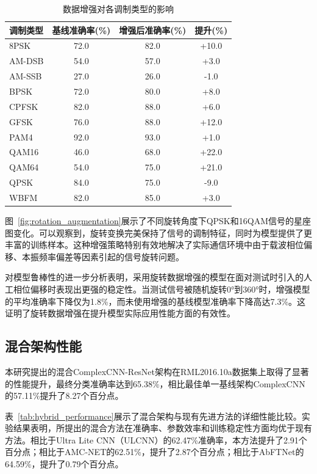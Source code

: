 \documentclass[conference]{IEEEtran}
\begin{document}
\begin{table}[h]
\centering
\caption{数据增强对各调制类型的影响}
\label{tab:data_augmentation_results}
\begin{tabular}{@{}lccc@{}}
\toprule
调制类型 & 基线准确率(\%) & 增强后准确率(\%) & 提升(\%) \\
\midrule
8PSK     & 72.0  & 82.0  & +10.0 \\
AM-DSB   & 54.0  & 57.0  & +3.0  \\
AM-SSB   & 27.0  & 26.0  & -1.0  \\
BPSK     & 72.0  & 80.0  & +8.0  \\
CPFSK    & 82.0  & 88.0  & +6.0  \\
GFSK     & 76.0  & 88.0  & +12.0 \\
PAM4     & 92.0  & 93.0  & +1.0  \\
QAM16    & 46.0  & 68.0  & +22.0 \\
QAM64    & 54.0  & 75.0  & +21.0 \\
QPSK     & 84.0  & 75.0  & -9.0  \\
WBFM     & 82.0  & 85.0  & +3.0  \\
\bottomrule
\end{tabular}
\end{table}

图~\ref{fig:rotation_augmentation}展示了不同旋转角度下QPSK和16QAM信号的星座图变化。可以观察到，旋转变换完美保持了信号的调制特征，同时为模型提供了更丰富的训练样本。这种增强策略特别有效地解决了实际通信环境中由于载波相位偏移、本振频率偏差等因素引起的信号旋转问题。

对模型鲁棒性的进一步分析表明，采用旋转数据增强的模型在面对测试时引入的人工相位偏移时表现出更强的稳定性。当测试信号被随机旋转0°到360°时，增强模型的平均准确率下降仅为1.8\%，而未使用增强的基线模型准确率下降高达7.3\%。这证明了旋转数据增强在提升模型实际应用性能方面的有效性。

\subsection{混合架构性能}

本研究提出的混合ComplexCNN-ResNet架构在RML2016.10a数据集上取得了显著的性能提升，最终分类准确率达到65.38\%，相比最佳单一基线架构ComplexCNN的57.11\%提升了8.27个百分点。

表~\ref{tab:hybrid_performance}展示了混合架构与现有先进方法的详细性能比较。实验结果表明，所提出的混合方法在准确率、参数效率和训练稳定性方面均优于现有方法。相比于Ultra Lite CNN（ULCNN）的62.47\%准确率，本方法提升了2.91个百分点；相比于AMC-NET的62.51\%，提升了2.87个百分点；相比于AbFTNet的64.59\%，提升了0.79个百分点。
\end{document}
